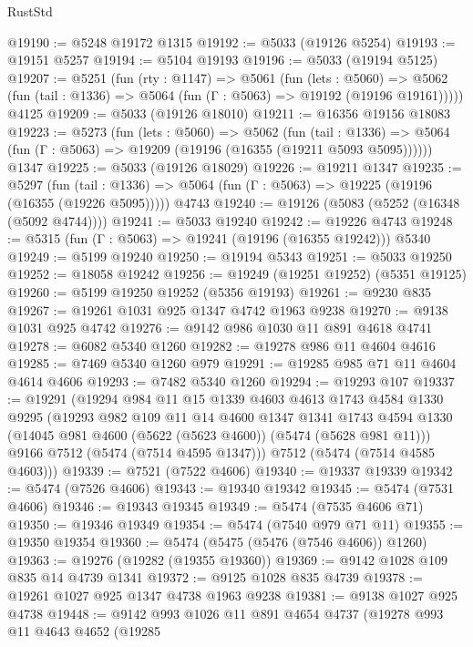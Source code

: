 \begin{lexlean}{RustStd}
\begin{coremodule}
@19190 := @5248 @19172 @1315
@19192 := @5033 (@19126 @5254)
@19193 := @19151 @5257
@19194 := @5104 @19193
@19196 := @5033 (@19194 @5125)
@19207 := @5251
    (fun (rty : @1147) =>
    @5061
      (fun (lets : @5060) =>
      @5062 (fun (tail : @1336) => @5064 (fun (Γ : @5063) => @19192 (@19196 @19161)))))
    @4125
@19209 := @5033 (@19126 @18010)
@19211 := @16356 @19156 @18083
@19223 := @5273
    (fun (lets : @5060) =>
    @5062
      (fun (tail : @1336) =>
      @5064 (fun (Γ : @5063) => @19209 (@19196 (@16355 (@19211 @5093 @5095))))))
    @1347
@19225 := @5033 (@19126 @18029)
@19226 := @19211 @1347
@19235 := @5297
    (fun (tail : @1336) => @5064 (fun (Γ : @5063) => @19225 (@19196 (@16355 (@19226 @5095)))))
    @4743
@19240 := @19126 (@5083 (@5252 (@16348 (@5092 @4744))))
@19241 := @5033 @19240
@19242 := @19226 @4743
@19248 := @5315 (fun (Γ : @5063) => @19241 (@19196 (@16355 @19242))) @5340
@19249 := @5199 @19240
@19250 := @19194 @5343
@19251 := @5033 @19250
@19252 := @18058 @19242
@19256 := @19249 (@19251 @19252) (@5351 @19125)
@19260 := @5199 @19250 @19252 (@5356 @19193)
@19261 := @9230 @835
@19267 := @19261 @1031 @925 @1347 @4742 @1963 @9238
@19270 := @9138 @1031 @925 @4742
@19276 := @9142 @986 @1030 @11 @891 @4618 @4741
@19278 := @6082 @5340 @1260
@19282 := @19278 @986 @11 @4604 @4616
@19285 := @7469 @5340 @1260 @979
@19291 := @19285 @985 @71 @11 @4604 @4614 @4606
@19293 := @7482 @5340 @1260
@19294 := @19293 @107
@19337 := @19291
    (@19294
      @984
      @11
      @15
      @1339
      @4603
      @4613
      @1743
      @4584
      @1330
      @9295
      (@19293
        @982
        @109
        @11
        @14
        @4600
        @1347
        @1341
        @1743
        @4594
        @1330
        (@14045 @981 @4600 (@5622 (@5623 @4600)) (@5474 (@5628 @981 @11)))
        @9166
        @7512
        (@5474 (@7514 @4595 @1347)))
      @7512
      (@5474 (@7514 @4585 @4603)))
@19339 := @7521 (@7522 @4606)
@19340 := @19337 @19339
@19342 := @5474 (@7526 @4606)
@19343 := @19340 @19342
@19345 := @5474 (@7531 @4606)
@19346 := @19343 @19345
@19349 := @5474 (@7535 @4606 @71)
@19350 := @19346 @19349
@19354 := @5474 (@7540 @979 @71 @11)
@19355 := @19350 @19354
@19360 := @5474 (@5475 (@5476 (@7546 @4606)) @1260)
@19363 := @19276 (@19282 (@19355 @19360))
@19369 := @9142 @1028 @109 @835 @14 @4739 @1341
@19372 := @9125 @1028 @835 @4739
@19378 := @19261 @1027 @925 @1347 @4738 @1963 @9238
@19381 := @9138 @1027 @925 @4738
@19448 := @9142
    @993
    @1026
    @11
    @891
    @4654
    @4737
    (@19278
      @993
      @11
      @4643
      @4652
      (@19285

\end{coremodule}
\end{lexlean}
